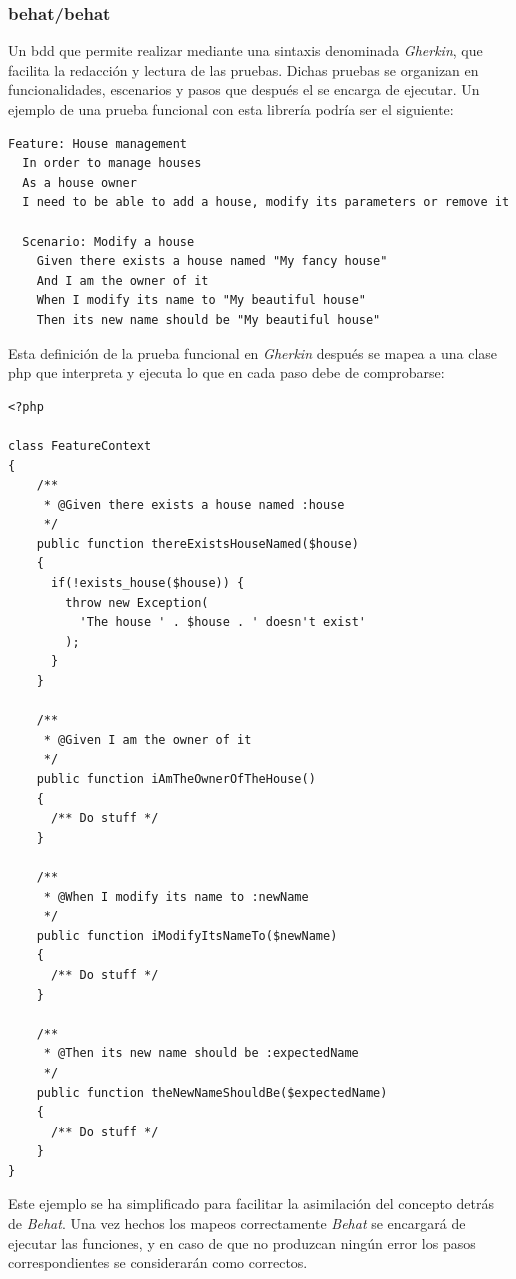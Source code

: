 \subsubsection{behat/behat}
Un  \gls{bdd} que permite realizar
 mediante una sintaxis denominada
\textit{Gherkin}, que facilita la redacción y lectura de las pruebas.
Dichas pruebas se organizan en funcionalidades, escenarios y pasos que después
el  se encarga de ejecutar. Un ejemplo de una
prueba funcional con esta librería podría ser el siguiente:

\begin{verbatim}
Feature: House management
  In order to manage houses
  As a house owner
  I need to be able to add a house, modify its parameters or remove it

  Scenario: Modify a house
    Given there exists a house named "My fancy house"
    And I am the owner of it
    When I modify its name to "My beautiful house"
    Then its new name should be "My beautiful house"
\end{verbatim}

Esta definición de la prueba funcional en \textit{Gherkin} después se mapea a
una clase \gls{php} que interpreta y ejecuta lo que en cada paso debe de
comprobarse:

\begin{verbatim}
<?php

class FeatureContext
{
    /**
     * @Given there exists a house named :house
     */
    public function thereExistsHouseNamed($house)
    {
      if(!exists_house($house)) {
        throw new Exception(
          'The house ' . $house . ' doesn't exist'
        );
      }
    }

    /**
     * @Given I am the owner of it
     */
    public function iAmTheOwnerOfTheHouse()
    {
      /** Do stuff */
    }

    /**
     * @When I modify its name to :newName
     */
    public function iModifyItsNameTo($newName)
    {
      /** Do stuff */
    }

    /**
     * @Then its new name should be :expectedName
     */
    public function theNewNameShouldBe($expectedName)
    {
      /** Do stuff */
    }
}
\end{verbatim}
Este ejemplo se ha simplificado para facilitar la asimilación del concepto
detrás de \textit{Behat}. Una vez hechos los mapeos correctamente
\textit{Behat} se encargará de ejecutar las funciones, y en caso de que no
produzcan ningún error los pasos correspondientes se considerarán como
correctos.

